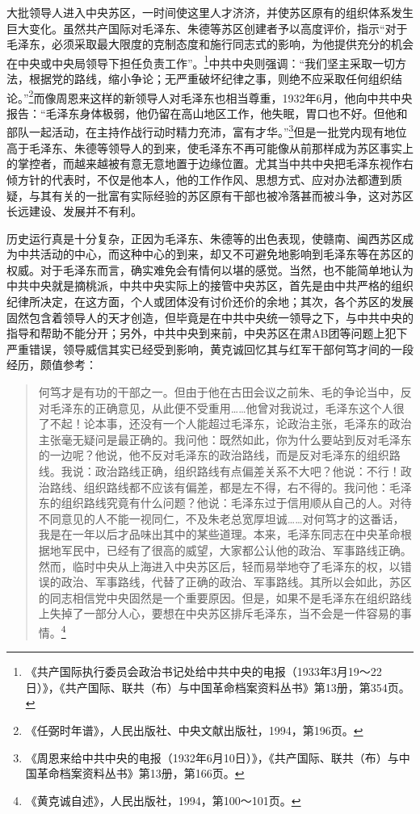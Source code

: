 大批领导人进入中央苏区，一时间使这里人才济济，并使苏区原有的组织体系发生巨大变化。虽然共产国际对毛泽东、朱德等苏区创建者予以高度评价，指示“对于毛泽东，必须采取最大限度的克制态度和施行同志式的影响，为他提供充分的机会在中央或中央局领导下担任负责工作”。\footnote{《共产国际执行委员会政治书记处给中共中央的电报（1933年3月19～22日）》，《共产国际、联共（布）与中国革命档案资料丛书》第13册，第354页。}中共中央则强调：“我们坚主采取一切方法，根据党的路线，缩小争论；无严重破坏纪律之事，则绝不应采取任何组织结论。”\footnote{《任弼时年谱》，人民出版社、中央文献出版社，1994，第196页。}而像周恩来这样的新领导人对毛泽东也相当尊重，1932年6月，他向中共中央报告：“毛泽东身体极弱，他仍留在高山地区工作，他失眠，胃口也不好。但他和部队一起活动，在主持作战行动时精力充沛，富有才华。”\footnote{《周恩来给中共中央的电报（1932年6月10日）》，《共产国际、联共（布）与中国革命档案资料丛书》第13册，第166页。}但是一批党内现有地位高于毛泽东、朱德等领导人的到来，使毛泽东不再可能像从前那样成为苏区事实上的掌控者，而越来越被有意无意地置于边缘位置。尤其当中共中央把毛泽东视作右倾方针的代表时，不仅是他本人，他的工作作风、思想方式、应对办法都遭到质疑，与其有关的一批富有实际经验的苏区原有干部也被冷落甚而被斗争，这对苏区长远建设、发展并不有利。


历史运行真是十分复杂，正因为毛泽东、朱德等的出色表现，使赣南、闽西苏区成为中共活动的中心，而这种中心的到来，却又不可避免地影响到毛泽东等在苏区的权威。对于毛泽东而言，确实难免会有情何以堪的感觉。当然，也不能简单地认为中共中央就是摘桃派，中共中央实际上的接管中央苏区，首先是由中共严格的组织纪律所决定，在这方面，个人或团体没有讨价还价的余地；其次，各个苏区的发展固然包含着领导人的天才创造，但毕竟是在中共中央统一领导之下，与中共中央的指导和帮助不能分开；另外，中共中央到来前，中央苏区在肃AB团等问题上犯下严重错误，领导威信其实已经受到影响，黄克诚回忆其与红军干部何笃才间的一段经历，颇值参考：

\begin{quote}

何笃才是有功的干部之一。但由于他在古田会议之前朱、毛的争论当中，反对毛泽东的正确意见，从此便不受重用……他曾对我说过，毛泽东这个人很了不起！论本事，还没有一个人能超过毛泽东，论政治主张，毛泽东的政治主张毫无疑问是最正确的。我问他：既然如此，你为什么要站到反对毛泽东的一边呢？他说，他不反对毛泽东的政治路线，而是反对毛泽东的组织路线。我说：政治路线正确，组织路线有点偏差关系不大吧？他说：不行！政治路线、组织路线都不应该有偏差，都是左不得，右不得的。我问他：毛泽东的组织路线究竟有什么问题？他说：毛泽东过于信用顺从自己的人。对待不同意见的人不能一视同仁，不及朱老总宽厚坦诚……对何笃才的这番话，我是在一年以后才品味出其中的某些道理。本来，毛泽东同志在中央革命根据地军民中，已经有了很高的威望，大家都公认他的政治、军事路线正确。然而，临时中央从上海进入中央苏区后，轻而易举地夺了毛泽东的权，以错误的政治、军事路线，代替了正确的政治、军事路线。其所以会如此，苏区的同志相信党中央固然是一个重要原因。但是，如果不是毛泽东在组织路线上失掉了一部分人心，要想在中央苏区排斥毛泽东，当不会是一件容易的事情。\footnote{《黄克诚自述》，人民出版社，1994，第100～101页。}
\end{quote}


